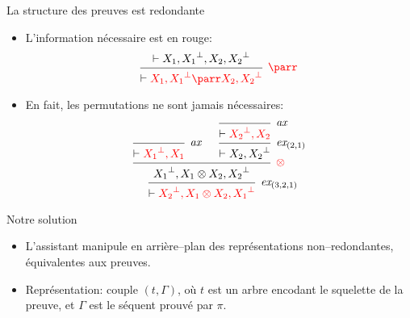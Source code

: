 \documentclass{beamer}
\newcommand*{\orth}{^\perp}
\newcommand*{\tensor}{\otimes}
\newcommand*{\hypv}[1]{\hypo{\vdash #1}}
\newcommand*{\axv}[1]{\infer{0}[\ensuremath{\mathit{ax}}]{\vdash #1}}
\newcommand*{\permv}[2]{\infer{1}[\ensuremath{\textit{ex}_{#1}}]{\vdash #2}}
\newcommand*{\someproof}{\pi}
\newcommand*{\sequent}{\Gamma}
\newcommand*{\foblig}[1]{\textcolor{red}{#1}}
\begin{document}
\begin{frame}{La structure des preuves est redondante}
    \begin{itemize}
        \item L'information nécessaire est en rouge:
            \begin{equation*}
            \begin{prooftree}
                \hypv{X_1, {X_1}\orth, X_2, {X_2}\orth}
                {\infer{1}[\foblig{\ensuremath{\parr}}]{\vdash \foblig{X_1, {X_1}\orth \parr X_2, {X_2}\orth}}}
            \end{prooftree}
            \end{equation*}
            \pause
        \item En fait, les permutations ne sont jamais nécessaires:
            \begin{equation*}
                \begin{prooftree}
                    \axv{\foblig{{X_1}\orth, X_1}}
                    \axv{\foblig{{X_2}\orth, X_2}}
                    \permv{(2, 1)}{X_2, {X_2}\orth}
                    {\infer{2}[\foblig{\ensuremath{\tensor}}]{{X_1}\orth, X_1 \tensor X_2, {X_2}\orth}}
                    \permv{(3, 2, 1)}{\foblig{{X_2}\orth, X_1 \tensor X_2, {X_1}\orth}}
                \end{prooftree}
            \end{equation*}
    \end{itemize}
\end{frame}

\begin{frame}{Notre solution}
    \begin{itemize}
        \item L'assistant manipule en arrière--plan des représentations non--redondantes, équivalentes aux preuves.
            \pause
        \item Représentation: couple $(t, \sequent)$\pause, où $t$ est un arbre encodant le squelette de la preuve\pause, et $\sequent$ est le séquent prouvé par $\someproof$.
     \end{itemize}
\end{frame}
\end{document}
